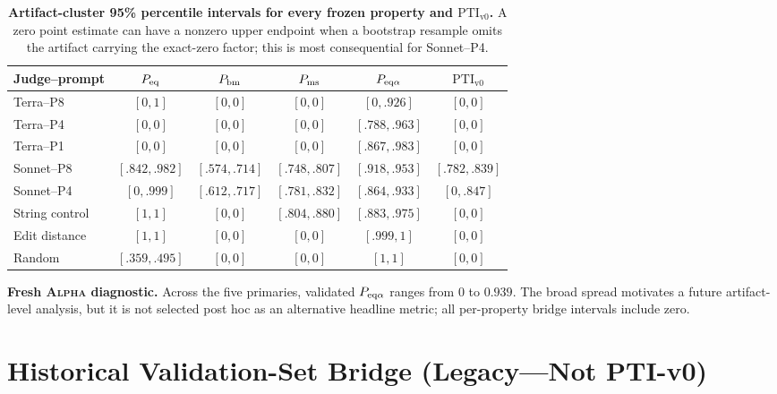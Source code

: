 \documentclass{article}
\newcommand{\PTI}{\mathrm{PTI}}                  %
\newcommand{\PTIvzero}{\PTI_{\mathrm{v0}}}        %
\begin{document}
\begin{table}[H]
  \centering
  \scriptsize
  \setlength{\tabcolsep}{2.2pt}
  \begin{tabular}{lccccc}
    \toprule
    \textbf{Judge--prompt} & $P_{\rm eq}$ & $P_{\rm bm}$ & $P_{\rm ms}$ & $P_{\rm eq\alpha}$ & $\PTIvzero$ \\
    \midrule
    Terra--P8      & $[0,1]$       & $[0,0]$       & $[0,0]$       & $[0,.926]$     & $[0,0]$ \\
    Terra--P4      & $[0,0]$       & $[0,0]$       & $[0,0]$       & $[.788,.963]$  & $[0,0]$ \\
    Terra--P1      & $[0,0]$       & $[0,0]$       & $[0,0]$       & $[.867,.983]$  & $[0,0]$ \\
    Sonnet--P8     & $[.842,.982]$ & $[.574,.714]$ & $[.748,.807]$ & $[.918,.953]$  & $[.782,.839]$ \\
    Sonnet--P4     & $[0,.999]$    & $[.612,.717]$ & $[.781,.832]$ & $[.864,.933]$  & $[0,.847]$ \\
    String control & $[1,1]$       & $[0,0]$       & $[.804,.880]$ & $[.883,.975]$  & $[0,0]$ \\
    Edit distance  & $[1,1]$       & $[0,0]$       & $[0,0]$       & $[.999,1]$     & $[0,0]$ \\
    Random         & $[.359,.495]$ & $[0,0]$       & $[0,0]$       & $[1,1]$        & $[0,0]$ \\
    \bottomrule
  \end{tabular}
  \caption{\textbf{Artifact-cluster 95\% percentile intervals for every frozen property and $\PTIvzero$.} A zero point estimate can have a nonzero upper endpoint when a bootstrap resample omits the artifact carrying the exact-zero factor; this is most consequential for Sonnet--P4.}
  \label{tab:pti-v0-property-cis}
\end{table}

\textbf{Fresh \textsc{Alpha} diagnostic.}
Across the five primaries, validated $P_{\rm eq\alpha}$ ranges from $0$ to $0.939$. The broad spread motivates a future artifact-level analysis, but it is not selected post hoc as an alternative headline metric; all per-property bridge intervals include zero.

\section{Historical Validation-Set Bridge (Legacy---Not PTI-v0)}\label{app:exp16-exp17}
\end{document}
